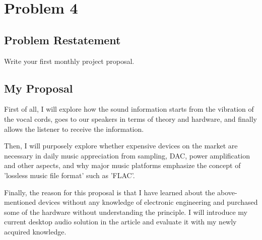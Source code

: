 \documentclass{article}
\begin{document}
\section{Problem 4}
\subsection{Problem Restatement}
Write your first monthly project proposal.

\subsection{My Proposal}

First of all, I will explore how the sound information starts from the vibration of the vocal cords, goes to our speakers in terms of theory and hardware, and finally allows the listener to receive the information.

Then, I will purposely explore whether expensive devices on the market are necessary in daily music appreciation from sampling, DAC, power amplification and other aspects, and why major music platforms emphasize the concept of 'lossless music file format' such as 'FLAC'.

Finally, the reason for this proposal is that I have learned about the above-mentioned devices without any knowledge of electronic engineering and purchased some of the hardware without understanding the principle. I will introduce my current desktop audio solution in the article and evaluate it with my newly acquired knowledge.

% 
% 

\begin{appendices}
    
\end{appendices}
\end{document}
